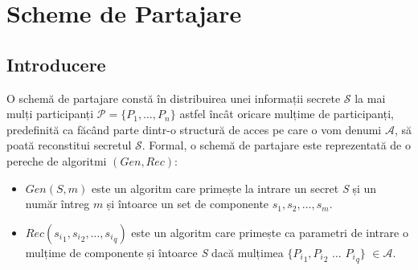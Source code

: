 \documentclass[oneside, 12pt]{book}
\begin{document}

\chapter{Scheme de Partajare}
\label{chap:secret_sharing}


\section{Introducere}
\label{sec:intro_secret_sharing}

O schemă de partajare constă în distribuirea unei informații secrete $\mathcal{S}$ la mai mulți participanți $\mathcal{P} = \{P_1, \dots, P_n\}$ astfel încât oricare mulțime de participanți, predefinită ca făcând parte dintr-o structură de acces pe care o vom denumi $\mathcal{A}$, să poată reconstitui secretul $\mathcal{S}$.
Formal, o schemă de partajare este reprezentată de o pereche de algoritmi \textbf{$(Gen, Rec)$}:
\begin{itemize}
	\item \textit{$Gen(S, m)$} este un algoritm care primește la intrare un secret \textit{S} și un număr întreg $m$ și întoarce un set de componente ${s_1, s_2, \dots, s_m}$.
	\item \textit{$Rec({s_i}_1, {s_i}_2, \dots, {s_i}_q)$} este un algoritm care primește ca parametri de intrare o mulțime de componente și întoarce \textit{S} dacă mulțimea $\{{P_i}_1, {P_i}_2$ $\dots$ ${P_i}_q \}$ $\in \mathcal{A}$.
\end{itemize} 
\end{document}
